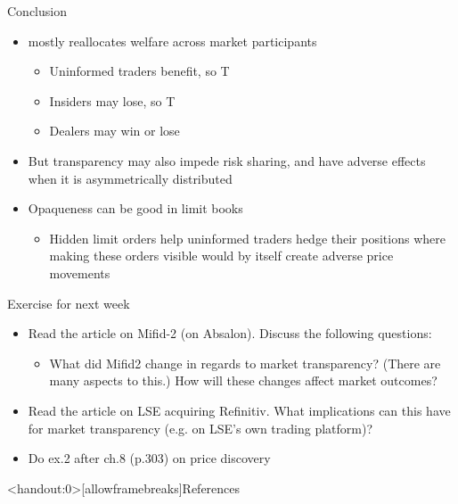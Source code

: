 \documentclass[english,10pt
,aspectratio=169
]{beamer}
\begin{document}
\begin{frame}{Conclusion}
	\begin{itemize}
		\item {} mostly reallocates welfare across market participants 
		\begin{itemize}
			\item Uninformed traders benefit, so T 
			\item Insiders may lose, so T 
			\item Dealers may win or lose
		\end{itemize}
		\item But transparency may also impede risk sharing, and have adverse effects when it is asymmetrically distributed
		\item Opaqueness can be good in limit books
		\begin{itemize}
			\item Hidden limit orders help uninformed traders hedge their positions where making these orders visible would by itself create adverse price movements
		\end{itemize}
	\end{itemize}
\end{frame}


\begin{frame}{Exercise for next week}
	\begin{itemize}
		\item Read the article on Mifid-2 (on Absalon). Discuss the following questions:
		\begin{itemize}
			\item What did Mifid2 change in regards to market transparency? (There are many aspects to this.) How will these changes affect market outcomes?
		\end{itemize}
		\item Read the article on LSE acquiring Refinitiv. What implications can this have for market transparency (e.g. on LSE's own trading platform)?
		\item Do ex.2 after ch.8 (p.303) on price discovery
	\end{itemize}
\end{frame}


\appendix
\begin{frame}<handout:0>[allowframebreaks]{References}
	
	
\end{frame}
\end{document}
